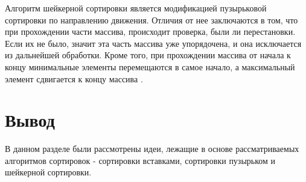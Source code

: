 Алгоритм шейкерной сортировки  является  модификацией  пузырьковой  сортировки  по направлению движения.  Отличия от нее заключаются в том, что при прохождении части массива, происходит проверка, были ли перестановки. Если их не было, значит эта часть массива уже упорядочена, и она исключается из дальнейшей обработки. Кроме того, при прохождении массива от начала к концу минимальные элементы перемещаются в самое начало, а максимальный элемент сдвигается к концу массива \cite{shaker_sort}.


\section*{Вывод}
В данном разделе были рассмотрены идеи, лежащие в основе рассматриваемых алгоритмов сортировок - сортировки вставками, сортировки пузырьком и шейкерной сортировки.